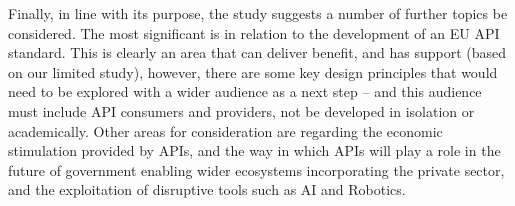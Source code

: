 Finally, in line with its purpose, the study suggests a number of further topics be considered. The most significant is in relation to the development of an EU API
standard. This is clearly an area that can deliver benefit, and has support (based
on our limited study), however, there are some key design principles that would need
to be explored with a wider audience as a next step – and this audience must include
API consumers and providers, not be developed in isolation or academically. Other
areas for consideration are regarding the economic stimulation provided by APIs, and
the way in which APIs will play a role in the future of government enabling wider
ecosystems incorporating the private sector, and the exploitation of disruptive tools
such as AI and Robotics.

